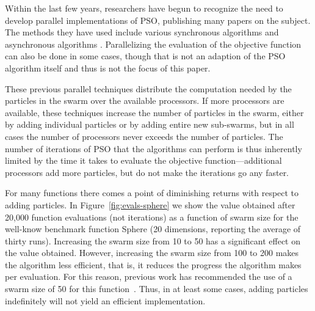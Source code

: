 \documentclass[journal,letterpaper]{IEEEtran}
\newcommand{\fig}[1]{Figure~\ref{fig:#1}}
\begin{document}
Within the last few years, researchers have begun to recognize the need to
develop parallel implementations of PSO, publishing many papers on the subject.
The methods they have used include various synchronous algorithms
\cite{mcnabb-2007-parallel-pso-using-mapreduce,
belal-2004-parallel-models-for-pso, chu-2006-intelligent-parallel-pso,
jin-2005-pso-antenna-designs, parsopoulos-2004-parallel-vector-evaluated-pso,
schutte-2004-parallel-global-optimization-with-pso} and asynchronous algorithms
\cite{koh-2006-parallel-asynchronous-pso,
mostaghim-2006-multi-objective-pso-on-grids,
venter-2005-parallel-pso-asynchronous-evaluations}.  Parallelizing the
evaluation of the objective function can also be done in some cases, though
that is not an adaption of the PSO algorithm itself and thus is not the focus
of this paper.

These previous parallel techniques distribute the computation needed by the
particles in the swarm over the available processors.  If more processors are
available, these techniques increase the number of particles in the swarm,
either by adding individual particles or by adding entire new sub-swarms, but
in all cases the number of processors never exceeds the number of particles.
The number of iterations of PSO that the algorithms can perform is thus
inherently limited by the time it takes to evaluate the objective
function---additional processors add more particles, but do not make the
iterations go any faster.

For many functions there comes a point of diminishing returns with respect to
adding particles.  In \fig{evals-sphere} we show the value obtained after
20,000 function evaluations (not iterations) as a function of swarm size for
the well-know benchmark function Sphere (20 dimensions, reporting the average
of thirty runs).  Increasing the swarm size from 10 to 50 has a significant
effect on the value obtained.  However, increasing the swarm size from 100 to
200 makes the algorithm less efficient, that is, it reduces the progress the
algorithm makes per evaluation.  For this reason, previous work has recommended
the use of a swarm size of 50 for this
function~\cite{bratton-2007-defining-a-standard-for-pso}.  Thus, in at least
some cases, adding particles indefinitely will not yield an efficient
implementation. 
\end{document}
